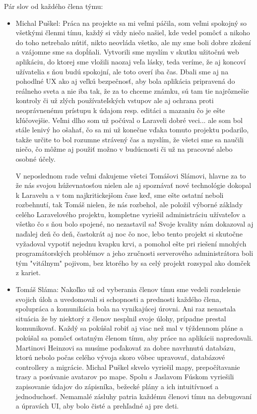 \documentclass[12pt,a4paper]{report}
\theoremstyle{definition}
\theoremstyle{remark}
\begin{document}
\bigbreak
\noindent Pár slov od každého člena týmu:
\begin{itemize}
\item Michal Puškel: Práca na projekte sa mi veľmi páčila, som veľmi spokojný so všetkými členmi tímu, každý si vždy niečo našiel, kde vedel pomôcť a nikoho do toho netrebalo nútiť, nikto neovláda všetko, ale my sme boli dobre zložení a vzájomne sme sa dopĺňali. Vytvorili sme myslím v skutku užitočnú web aplikáciu, do ktorej sme vložili naozaj veľa lásky, teda veríme, že aj koncoví užívatelia s ňou budú spokojní, ale toto overí iba čas. Dbali sme aj na pohodlné UX ako aj veľkú bezpečnosť, aby bola aplikácia pripravená do reálneho sveta a nie iba tak, že za to chceme známku, sú tam tie najrôznešie kontroly či už zlých používateľských vstupov ale aj ochrana proti neoprávnenému prístupu k údajom resp. editáci a mazaniu čo je ešte kľúčovejšie. Veľmi dlho som už počúval o Laraveli dobré veci... ale som bol stále lenivý ho ošahať, čo sa mi už konečne vďaka tomuto projektu podarilo, takže určite to bol rozumne strávený čas a myslím, že všetci sme sa naučili niečo, čo môžme aj použiť možno v budúcnosti či už na pracovné alebo osobné účely.

V neposlednom rade veľmi ďakujeme všetci Tomášovi Slámovi, hlavne za to že nás svojou húževnatosťou nielen ale aj spoznávať nové technológie dokopal k Laravelu a v tom najkritickejšom čase keď, sme ešte ostatní neboli rozbehnutí, tak Tomáš nielen, že nás rozbehol, ale položil výborné základy celého Laravelového projektu, kompletne vyriešil administráciu užívateľov a všetko čo s ňou bolo spojené, no nezastavil sa! Svoje kvality nám dokazoval aj naďalej deň čo deň, častokrát aj noc čo noc, lebo tento projekt si skutočne vyžadoval vypotiť nejednu kvapku krvi, a pomohol ešte pri riešení mnohých programátorských problémov a jeho zručnosti serverového administrátora boli tým "vitálnym" pojivom, bez ktorého by sa celý projekt rozsypal ako domček z kariet.


\item Tomáš Sláma: Nakoľko už od vyberania členov tímu sme vedeli rozdelenie svojich úloh a uvedomovali si
schopnosti a prednosti každého člena, spolupráca a komunikácia bola na vynikajúcej úrovni.
Ani raz nenastala situácia že by niektorý z členov nesplnil svoje úlohy, prípadne prestal komunikovať.
Každý sa pokúšal robiť aj viac než mal v týždennom pláne a pokúšal sa pomôcť ostatným členom tímu,
aby práce na aplikácii napredovali. 
Martinovi Heinzovi sa musíme poďakovať za dobre navrhnutú databázu, ktorú nebolo počas celého vývoja skoro vôbec 
upravovať, databázové controllery a migrácie.
Michal Puškel skvelo vyriešil mapy, prepočítavanie trasy a posúvanie avatarov po mape. Spolu s Jaslavom Fúskom vyriešili
zapisovanie údajov do zápisníka, bežecké plány a ich intuitívnosť a jednoduchosť. Nemamalé zásluhy patria každému členovi tímu 
na debugovaní a úpravách UI, aby bolo čisté a prehľadné aj pre deti.


\end{itemize}
\end{document}
